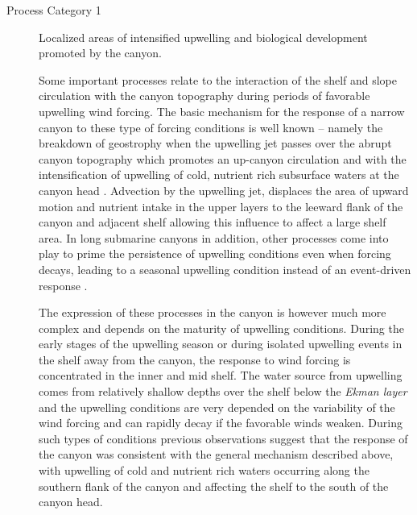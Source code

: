 \begin{description}
  
\item[Process Category 1] Localized areas of intensified upwelling and
  biological development promoted by the canyon.

  Some important processes relate to the interaction of the shelf and
  slope circulation with the canyon topography during periods of
  favorable upwelling wind forcing. The basic mechanism for the
  response of a narrow canyon to these type of forcing conditions is
  well known -- namely the breakdown of geostrophy when the upwelling
  jet passes over the abrupt canyon topography which promotes an
  up-canyon circulation and with the intensification of upwelling of
  cold, nutrient rich subsurface waters at the canyon head
  \cite{klinck96,she00}. Advection by the upwelling jet, displaces the
  area of upward motion and nutrient intake in the upper layers to the
  leeward flank of the canyon and adjacent shelf allowing this
  influence to affect a large shelf area. In long submarine canyons in
  addition, other processes come into play to prime the persistence of
  upwelling conditions even when forcing decays, leading to a seasonal
  upwelling condition instead of an event-driven response
  \cite{allen00,waterhouse09}.

  The expression of these processes in the \naz canyon is however much
  more complex and depends on the maturity of upwelling
  conditions. During the early stages of the upwelling season or
  during isolated upwelling events in the shelf away from the canyon,
  the response to wind forcing is concentrated in the inner and mid
  shelf. The water source from upwelling comes from relatively shallow
  depths over the shelf below the \emph{Ekman layer} and the upwelling
  conditions are very depended on the variability of the wind forcing
  and can rapidly decay if the favorable winds weaken.  During such
  types of conditions previous observations suggest that the response
  of the \naz canyon was consistent with the general mechanism
  described above, with upwelling of cold and nutrient rich waters
  occurring along the southern flank of the canyon and affecting the
  shelf to the south of the canyon head.
 

\end{description}
